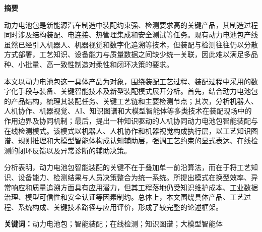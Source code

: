 \begin{center}
{\bfseries 摘\quad 要}
\end{center}

动力电池包是新能源汽车制造中装配约束强、检测要求高的关键产品，其制造过程同时涉及结构装配、电连接、热管理集成和安全测试等任务。现有动力电池包产线虽然已经引入机器人、机器视觉和数字化追溯等技术，但装配与检测往往仍以分散方式部署，工艺知识、设备能力与质量数据之间缺少统一关联，因此难以满足多品种、小批量、高一致性制造对柔性和闭环决策的要求。

本文以动力电池包这一具体产品为对象，围绕装配工艺过程、装配过程中采用的数字化手段与装备、关键智能技术及新型装配模式展开分析。首先，结合动力电池包的产品结构，梳理其装配任务、关键工艺链和主要检测节点；其次，分析机器人、人机协作、机器视觉、AI、知识图谱和大模型智能体等多类技术在装配现场中的作用边界及协同机制；最后，提出一种知识驱动的人机协同动力电池包智能装配与在线检测模式。该模式以机器人、人机协作和机器视觉构成执行层，以工艺知识图谱、规则推理和大模型智能体构成认知辅助层，强调工艺约束的显式表达、在线检测的闭环反馈以及异常诊断的辅助决策。

分析表明，动力电池包智能装配的关键不在于叠加单一前沿算法，而在于将工艺知识、设备能力、检测结果与人员决策整合为统一系统。所提出模式在换型效率、异常响应和质量追溯方面具有应用潜力，但其工程落地仍受知识维护成本、工业数据治理、模型可信性和安全认证等因素制约。总体上，本文围绕具体产品、工艺过程、系统构成、关键技术路径与应用评价，形成了较完整的论述框架。

\vspace{1em}
\noindent\textbf{关键词：}动力电池包；智能装配；在线检测；知识图谱；大模型智能体
